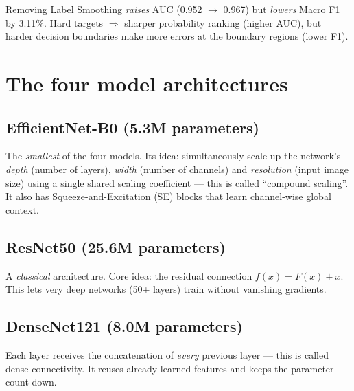 \documentclass[11pt,a4paper]{article}
\begin{document}
\begin{idea}
Removing Label Smoothing \textit{raises} AUC (0.952 $\to$ 0.967) but \textit{lowers} Macro F1 by 3.11\%. Hard targets $\Rightarrow$ sharper probability ranking (higher AUC), but harder decision boundaries make more errors at the boundary regions (lower F1).
\end{idea}

\section{The four model architectures}

\subsection{EfficientNet-B0 (5.3M parameters)}

\begin{simple}
The \textit{smallest} of the four models. Its idea: simultaneously scale up the network's \textit{depth} (number of layers), \textit{width} (number of channels) and \textit{resolution} (input image size) using a single shared scaling coefficient --- this is called ``compound scaling''. It also has Squeeze-and-Excitation (SE) blocks that learn channel-wise global context.
\end{simple}

\subsection{ResNet50 (25.6M parameters)}

\begin{simple}
A \textit{classical} architecture. Core idea: the residual connection $f(x) = F(x) + x$. This lets very deep networks (50+ layers) train without vanishing gradients.
\end{simple}

\subsection{DenseNet121 (8.0M parameters)}

\begin{simple}
Each layer receives the concatenation of \textit{every} previous layer --- this is called dense connectivity. It reuses already-learned features and keeps the parameter count down.
\end{simple}
\end{document}
